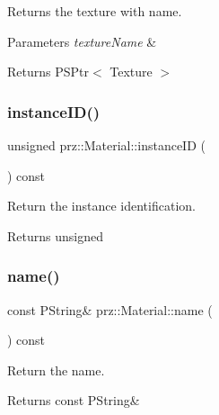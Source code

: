 Returns the texture with name. 


\begin{DoxyParams}{Parameters}
{\em texture\+Name} & \\
\hline
\end{DoxyParams}
\begin{DoxyReturn}{Returns}
P\+S\+Ptr$<$ Texture $>$ 
\end{DoxyReturn}
\mbox{\label{classprz_1_1_material_ab65ef8e87a39279c67fa334ac044d1c8}} 
\subsubsection{\texorpdfstring{instanceID()}{instanceID()}}
{\footnotesize\ttfamily unsigned prz\+::\+Material\+::instance\+ID (\begin{DoxyParamCaption}{ }\end{DoxyParamCaption}) const\hspace{0.3cm}{\ttfamily [inline]}}



Return the instance identification. 

\begin{DoxyReturn}{Returns}
unsigned 
\end{DoxyReturn}
\mbox{\label{classprz_1_1_material_ab1b2f9074aea77954b1ad70b72f48c3a}} 
\subsubsection{\texorpdfstring{name()}{name()}}
{\footnotesize\ttfamily const P\+String\& prz\+::\+Material\+::name (\begin{DoxyParamCaption}{ }\end{DoxyParamCaption}) const\hspace{0.3cm}{\ttfamily [inline]}}



Return the name. 

\begin{DoxyReturn}{Returns}
const P\+String\& 
\end{DoxyReturn}
\mbox{\label{classprz_1_1_material_a7c0a75268c108df5c8b7779c9be7b80a}} 

